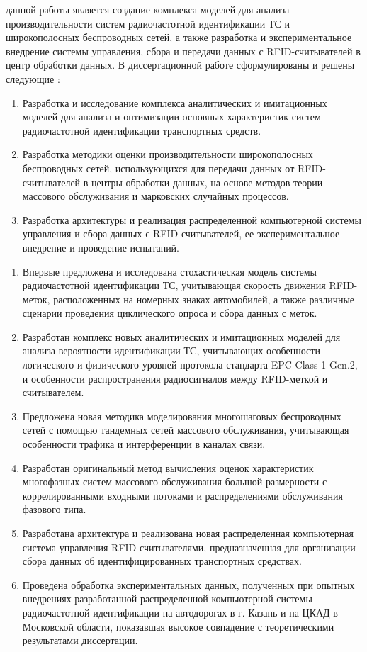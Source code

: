 {\aim} данной работы является создание комплекса моделей для анализа производительности систем радиочастотной идентификации ТС и широкополосных беспроводных сетей, а также разработка и экспериментальное внедрение системы управления, сбора и передачи данных с RFID-считывателей в центр обработки данных. В диссертационной работе сформулированы и решены следующие {\tasks}:
\begin{enumerate}[beginpenalty=10000] %
  \item Разработка и исследование комплекса аналитических и имитационных моделей для анализа и оптимизации основных характеристик систем радиочастотной идентификации транспортных средств.
  \item Разработка методики оценки производительности широкополосных беспроводных сетей, использующихся для передачи данных от RFID-считывателей в центры обработки данных, на основе методов теории массового обслуживания и марковских случайных процессов.
  \item Разработка архитектуры и реализация распределенной компьютерной системы управления и сбора данных с RFID-считывателей, ее экспериментальное внедрение и проведение испытаний.
\end{enumerate}


{\novelty}
\begin{enumerate}[beginpenalty=10000] %
  \item Впервые предложена и исследована стохастическая модель системы радиочастотной идентификации ТС, учитывающая скорость движения RFID-меток, расположенных на номерных знаках автомобилей, а также различные сценарии проведения циклического опроса и сбора данных с меток.
  \item Разработан комплекс новых аналитических и имитационных моделей для анализа вероятности идентификации ТС, учитывающих особенности логического и физического уровней протокола стандарта EPC Class 1 Gen.2, и особенности распространения радиосигналов между RFID-меткой и считывателем.
  \item Предложена новая методика моделирования многошаговых беспроводных сетей с помощью тандемных сетей массового обслуживания, учитывающая особенности трафика и интерференции в каналах связи.
  \item Разработан оригинальный метод вычисления оценок характеристик многофазных систем массового обслуживания большой размерности с коррелированными входными потоками и распределениями обслуживания фазового типа.
  \item Разработана архитектура и реализована новая распределенная компьютерная система управления RFID-считывателями, предназначенная для организации сбора данных об идентифицированных транспортных средствах.
  \item Проведена обработка экспериментальных данных, полученных при опытных внедрениях разработанной распределенной компьютерной системы радиочастотной идентификации на автодорогах в г. Казань и на ЦКАД в Московской области, показавшая высокое совпадение с теоретическими результатами диссертации.
\end{enumerate}

